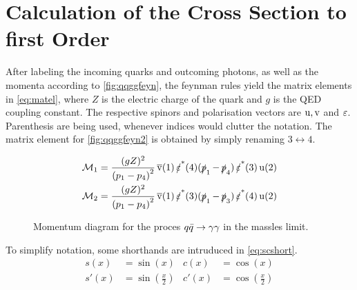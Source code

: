\section{Calculation of the Cross Section to first Order}%
\label{sec:qqggcalc}

After labeling the incoming quarks and outcoming photons, as well as
the momenta according to \cref{fig:qqggfeyn}, the feynman rules yield
the matrix elements in \cref{eq:matel}, where \(Z\) is the electric
charge of the quark and \(g\) is the QED coupling constant. The
respective spinors and polarisation vectors are \(\operatorname{u},\operatorname{v}\) and
\(\operatorname{\varepsilon}\). Parenthesis are being used, whenever indices would clutter
the notation. The matrix element for \cref{fig:qqggfeyn2} is obtained
by simply renaming \(3\leftrightarrow 4\).

\begin{align}
  \label{eq:matel}
  \mathcal{M}_1 &= \frac{(gZ)^2}{\qty(p_1 - p_4)^2}\vsb(1)\pses(4)(\ps_1 -
                \ps_4)\pses(3)\us(2)\\
  \mathcal{M}_2 &= \frac{(gZ)^2}{\qty(p_1 - p_4)^2}\vsb(1)\pses(3)(\ps_1 - \ps_3)\pses(4)\us(2)
\end{align}

\begin{wrapfigure}{R}{0.4\textwidth}
\centering
{}
\caption{\label{fig:qqimpulses} Momentum diagram for the proces
  \(q\bar{q}\rightarrow\gamma\gamma\) in the massles limit.}
\end{wrapfigure}


To simplify notation, some shorthands are intruduced
in \cref{eq:scshort}.
\begin{equation}
  \label{eq:scshort}
  \begin{split}
    s(x) &= \sin(x) & c(x) &= \cos(x) \\ s'(x) &= \sin(\frac{x}{2}) & c'(x) &= \cos(\frac{x}{2})
  \end{split}
\end{equation}


